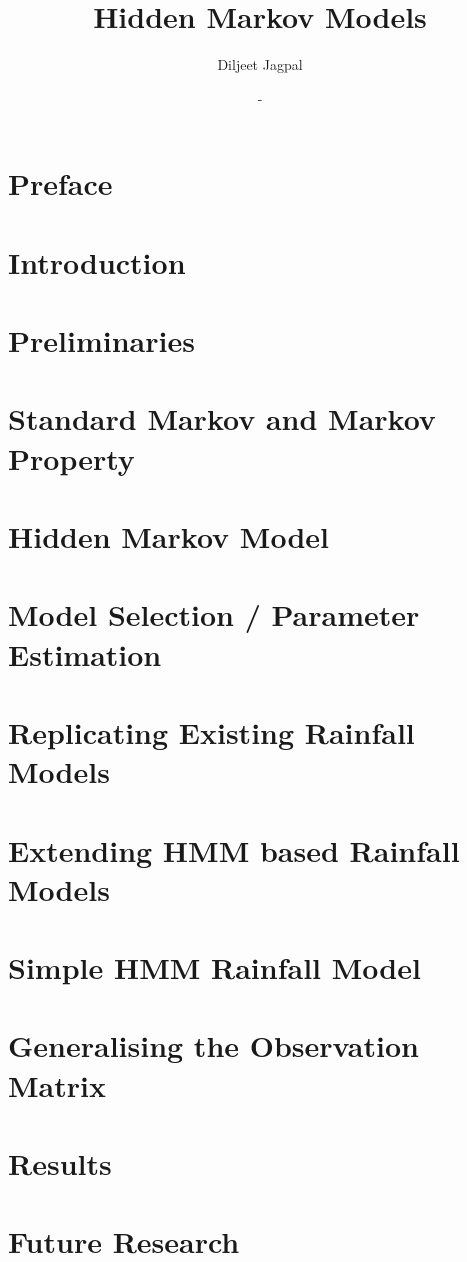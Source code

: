 \documentclass[a4paper,12pt]{report}
\title{\Huge Hidden Markov Models}
\author{Diljeet Jagpal}
\date{-}
\theoremstyle{plain}
\begin{document}
	\maketitle
	\tableofcontents

	\chapter*{Preface}
	

	\newpage

	\chapter{Introduction}
	
	\newpage

	\chapter{Preliminaries}
	
	\newpage

	\chapter{Standard Markov and Markov Property}
	
	\newpage

	\chapter{Hidden Markov Model}
	
	\newpage

	\chapter{Model Selection  / Parameter Estimation}
	
	\newpage

	\chapter{Replicating Existing Rainfall Models}
	
	\newpage

	\chapter{Extending HMM based Rainfall Models}
	
	\newpage

	\chapter{Simple HMM Rainfall Model}
	
	\newpage

	\chapter{Generalising the Observation Matrix}
	
	\newpage

	\chapter{Results}
	
	\newpage

	\chapter{Future Research}
	
	\newpage

	\nocite{*}
	\printbibliography
\end{document}
